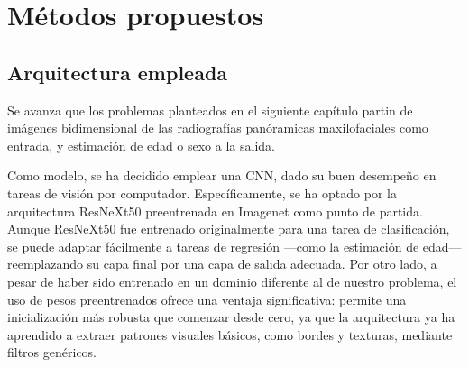 





\section{Métodos propuestos}

\subsection{Arquitectura empleada}

Se avanza que los problemas planteados en el siguiente capítulo partin de imágenes bidimensional de las radiografías panóramicas maxilofaciales como entrada, y estimación de edad o sexo a la salida.

Como modelo, se ha decidido emplear una CNN, dado su buen desempeño en tareas de visión por computador. Específicamente, se ha optado por la arquitectura ResNeXt50 \cite{xie2017} preentrenada en Imagenet \cite{deng2009} como punto de partida. Aunque ResNeXt50 fue entrenado originalmente para una tarea de clasificación, se puede adaptar fácilmente a tareas de regresión ---como la estimación de edad--- reemplazando su capa final por una capa de salida adecuada. Por otro lado, a pesar de haber sido entrenado en un dominio diferente al de nuestro problema, el uso de pesos preentrenados ofrece una ventaja significativa: permite una inicialización más robusta que comenzar desde cero, ya que la arquitectura ya ha aprendido a extraer patrones visuales básicos, como bordes y texturas, mediante filtros genéricos.


